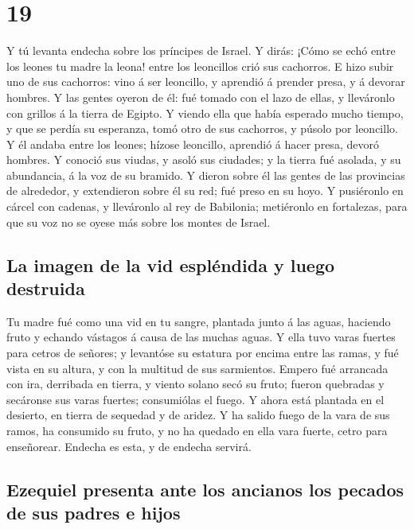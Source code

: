 \hypertarget{section-18}{%
\section{19}\label{section-18}}

 Y tú levanta endecha sobre los príncipes de Israel.
 Y dirás: ¡Cómo se echó entre los leones tu madre la leona!
entre los leoncillos crió sus cachorros.  E hizo subir uno
de sus cachorros: vino á ser leoncillo, y aprendió á prender presa, y á
devorar hombres.  Y las gentes oyeron de él: fué tomado con
el lazo de ellas, y lleváronlo con grillos á la tierra de Egipto.
 Y viendo ella que había esperado mucho tiempo, y que se
perdía su esperanza, tomó otro de sus cachorros, y púsolo por leoncillo.
 Y él andaba entre los leones; hízose leoncillo, aprendió á
hacer presa, devoró hombres.  Y conoció sus viudas, y asoló
sus ciudades; y la tierra fué asolada, y su abundancia, á la voz de su
bramido.  Y dieron sobre él las gentes de las provincias de
alrededor, y extendieron sobre él su red; fué preso en su hoyo.
 Y pusiéronlo en cárcel con cadenas, y lleváronlo al rey de
Babilonia; metiéronlo en fortalezas, para que su voz no se oyese más
sobre los montes de Israel.

\hypertarget{la-imagen-de-la-vid-espluxe9ndida-y-luego-destruida}{%
\subsection{La imagen de la vid espléndida y luego
destruida}\label{la-imagen-de-la-vid-espluxe9ndida-y-luego-destruida}}

 Tu madre fué como una vid en tu sangre, plantada junto á
las aguas, haciendo fruto y echando vástagos á causa de las muchas
aguas.  Y ella tuvo varas fuertes para cetros de señores; y
levantóse su estatura por encima entre las ramas, y fué vista en su
altura, y con la multitud de sus sarmientos.  Empero fué
arrancada con ira, derribada en tierra, y viento solano secó su fruto;
fueron quebradas y secáronse sus varas fuertes; consumiólas el fuego.
 Y ahora está plantada en el desierto, en tierra de
sequedad y de aridez.  Y ha salido fuego de la vara de sus
ramos, ha consumido su fruto, y no ha quedado en ella vara fuerte, cetro
para enseñorear. Endecha es esta, y de endecha servirá.

\hypertarget{ezequiel-presenta-ante-los-ancianos-los-pecados-de-sus-padres-e-hijos}{%
\subsection{Ezequiel presenta ante los ancianos los pecados de sus
padres e
hijos}\label{ezequiel-presenta-ante-los-ancianos-los-pecados-de-sus-padres-e-hijos}}

